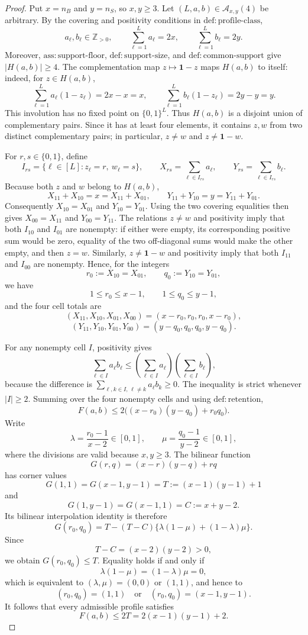 \documentclass{article}
\begin{document}
\begin{proof}
Put \(x=n_B\) and \(y=n_S\), so \(x,y\ge 3\).  Let \((L,a,b)\in\mathcal A_{x,y}(4)\) be arbitrary.  By the covering and positivity conditions in \(\mathrm{def{:}profile\text{-}class}\),
\[
 a_\ell,b_\ell\in\mathbb Z_{>0},\qquad
 \sum_{\ell=1}^L a_\ell=2x,\qquad
 \sum_{\ell=1}^L b_\ell=2y.
\]
Moreover, \(\mathrm{ass{:}support\text{-}floor}\), \(\mathrm{def{:}support\text{-}size}\), and \(\mathrm{def{:}common\text{-}support}\) give \(|H(a,b)|\ge4\).  The complementation map \(z\mapsto\mathbf 1-z\) maps \(H(a,b)\) to itself: indeed, for \(z\in H(a,b)\),
\[
 \sum_{\ell=1}^L a_\ell(1-z_\ell)=2x-x=x,
 \qquad
 \sum_{\ell=1}^L b_\ell(1-z_\ell)=2y-y=y.
\]
This involution has no fixed point on \(\{0,1\}^L\).  Thus \(H(a,b)\) is a disjoint union of complementary pairs.  Since it has at least four elements, it contains \(z,w\) from two distinct complementary pairs; in particular, \(z\ne w\) and \(z\ne\mathbf 1-w\).

For \(r,s\in\{0,1\}\), define
\[
 I_{rs}=\{\ell\in[L]:z_\ell=r,\ w_\ell=s\},\qquad
 X_{rs}=\sum_{\ell\in I_{rs}}a_\ell,\qquad
 Y_{rs}=\sum_{\ell\in I_{rs}}b_\ell.
\]
Because both \(z\) and \(w\) belong to \(H(a,b)\),
\[
 X_{11}+X_{10}=x=X_{11}+X_{01},
 \qquad
 Y_{11}+Y_{10}=y=Y_{11}+Y_{01}.
\]
Consequently \(X_{10}=X_{01}\) and \(Y_{10}=Y_{01}\).  Using the two covering equalities then gives \(X_{00}=X_{11}\) and \(Y_{00}=Y_{11}\).  The relations \(z\ne w\) and positivity imply that both \(I_{10}\) and \(I_{01}\) are nonempty: if either were empty, its corresponding positive sum would be zero, equality of the two off-diagonal sums would make the other empty, and then \(z=w\).  Similarly, \(z\ne\mathbf 1-w\) and positivity imply that both \(I_{11}\) and \(I_{00}\) are nonempty.  Hence, for the integers
\[
 r_0:=X_{10}=X_{01},\qquad q_0:=Y_{10}=Y_{01},
\]
we have
\[
 1\le r_0\le x-1,\qquad 1\le q_0\le y-1,
\]
and the four cell totals are
\[
 (X_{11},X_{10},X_{01},X_{00})=(x-r_0,r_0,r_0,x-r_0),
\]
\[
 (Y_{11},Y_{10},Y_{01},Y_{00})=(y-q_0,q_0,q_0,y-q_0).
\]

For any nonempty cell \(I\), positivity gives
\[
 \sum_{\ell\in I}a_\ell b_\ell
 \le \left(\sum_{\ell\in I}a_\ell\right)
       \left(\sum_{\ell\in I}b_\ell\right),
\]
because the difference is \(\sum_{\ell,k\in I,\,\ell\ne k}a_\ell b_k\ge0\).  The inequality is strict whenever \(|I|\ge2\).  Summing over the four nonempty cells and using \(\mathrm{def{:}retention}\),
\[
 F(a,b)\le 2\bigl((x-r_0)(y-q_0)+r_0q_0\bigr).
\]
Write
\[
 \lambda=\frac{r_0-1}{x-2}\in[0,1],\qquad
 \mu=\frac{q_0-1}{y-2}\in[0,1],
\]
where the divisions are valid because \(x,y\ge3\).  The bilinear function
\[
 G(r,q)=(x-r)(y-q)+rq
\]
has corner values
\[
 G(1,1)=G(x-1,y-1)=T:=(x-1)(y-1)+1
\]
and
\[
 G(1,y-1)=G(x-1,1)=C:=x+y-2.
\]
Its bilinear interpolation identity is therefore
\[
 G(r_0,q_0)
 =T-(T-C)\{\lambda(1-\mu)+(1-\lambda)\mu\}.
\]
Since
\[
 T-C=(x-2)(y-2)>0,
\]
we obtain \(G(r_0,q_0)\le T\).  Equality holds if and only if
\[
 \lambda(1-\mu)=(1-\lambda)\mu=0,
\]
which is equivalent to \((\lambda,\mu)=(0,0)\) or \((1,1)\), and hence to
\[
 (r_0,q_0)=(1,1)\quad\text{or}\quad(r_0,q_0)=(x-1,y-1).
\]
It follows that every admissible profile satisfies
\[
 F(a,b)\le2T=2(x-1)(y-1)+2.
\]


\end{proof}
\end{document}
